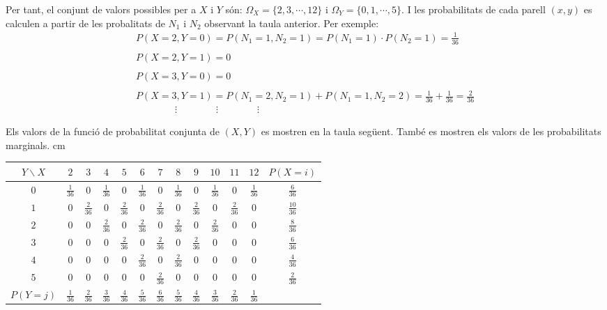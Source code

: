 \documentclass{article}
\begin{document}
\noindent
Per tant, el conjunt de valors possibles per a $X$ i $Y$ s\'on: $\Omega_X=\{ 2, 3, \cdots, 12 \}$ i 
$\Omega_Y=\{ 0, 1, \cdots, 5 \}$. I les probabilitats de cada parell $(x, y)$ es calculen a partir
de les probalitats de $N_1$ i $N_2$ observant la taula anterior. Per exemple: 
\[
\begin{array}{l}
P(X=2, Y=0)= P(N_1=1, N_2=1)= P(N_1=1) \cdot P(N_2=1)=\frac{1}{36} \\ \\
P(X=2, Y=1)= 0 \\ \\
P(X=3, Y=0)= 0 \\ \\
P(X=3, Y=1)=P(N_1=2, N_2=1)+P(N_1=1, N_2=2)=\frac{1}{36}+\frac{1}{36}=\frac{2}{36} \\
\qquad \qquad \vdots \qquad \qquad \vdots \qquad \qquad \vdots
\end{array}
\]

\noindent
Els valors de la funci\'o de probabilitat conjunta de $(X, Y)$ es mostren en la taula seg\"uent. Tamb\'e 
es mostren els valors de les probabilitats marginals.
 cm
\begin{center}
\begin{tabular}{c|c|c|c|c|c|c|c|c|c|c|c||c}
$Y \backslash X$ & $2$ & $3$ & $4$ & $5$ & $6$ & $7$ & $8$ & $9$ & $10$ & $11$ & $12$ & $P(X=i)$ \\ \hline
$0$ & $\frac{1}{36}$ & $0$ & $\frac{1}{36}$ & $0$ & $\frac{1}{36}$ &  $0$ & $\frac{1}{36}$ & $0$ & $\frac{1}{36}$ & 
$0$ & $\frac{1}{36}$ & $\frac{6}{36}$ \\ \hline
$1$ & $0$ & $\frac{2}{36}$ & $0$ & $\frac{2}{36}$ & $0$ & $\frac{2}{36}$ &  $0$ & $\frac{2}{36}$ & $0$ & $\frac{2}{36}$ & 
$0$  & $\frac{10}{36}$ \\ \hline
$2$ & $0$ & $0$ & $\frac{2}{36}$ & $0$ & $\frac{2}{36}$ & $0$ & $\frac{2}{36}$ &  $0$ & $\frac{2}{36}$ & $0$ & $0$  & $\frac{8}{36}$ \\ \hline
$3$ & $0$ & $0$ & $0$ & $\frac{2}{36}$ & $0$ & $\frac{2}{36}$ & $0$ & $\frac{2}{36}$ & $0$ & $0$ & $0$  & $\frac{6}{36}$ \\ \hline
$4$ & $0$ & $0$ & $0$ & $0$ & $\frac{2}{36}$ & $0$ & $\frac{2}{36}$ & $0$ & $0$ & $0$ & $0$  & $\frac{4}{36}$ \\ \hline
$5$ & $0$ & $0$ & $0$ & $0$ & $0$ & $\frac{2}{36}$ & $0$ & $0$ & $0$ & $0$ & $0$  & $\frac{2}{36}$ \\ \hline
$P(Y=j)$ & $\frac{1}{36}$ & $\frac{2}{36}$ & $\frac{3}{36}$ & $\frac{4}{36}$ & $\frac{5}{36}$ & 
$\frac{6}{36}$ & $\frac{5}{36}$ & $\frac{4}{36}$ & $\frac{3}{36}$ & $\frac{2}{36}$ & $\frac{1}{36}$ & \\ \hline
\end{tabular}
\end{center}
\end{document}
